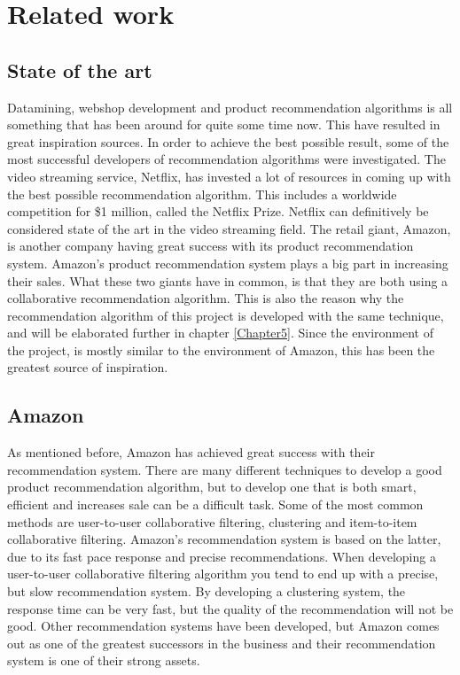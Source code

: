 
\chapter{Related work} %

\label{Chapter3} %


\section{State of the art}

Datamining, webshop development and product recommendation algorithms is all something that has been around for quite some time now. This have resulted in great inspiration sources. In order to achieve the best possible result, some of the most successful developers of recommendation algorithms were investigated. The video streaming service, Netflix, has invested a lot of resources in coming up with the best possible recommendation algorithm.\cite{Netflix} This includes a worldwide competition for \$1 million, called the Netflix Prize. \cite{NetflixPrize} Netflix can definitively be considered state of the art in the video streaming field. The retail giant, Amazon, is another company having great success with its product recommendation system. Amazon's product recommendation system plays a big part in increasing their sales.\cite{AmazonSuccess} What these two giants have in common, is that they are both using a collaborative recommendation algorithm. This is also the reason why the recommendation algorithm of this project is developed with the same technique, and will be elaborated further in chapter \ref{Chapter5}. Since the environment of the project, is mostly similar to the environment of Amazon, this has been the greatest source of inspiration. 


\section{Amazon}
As mentioned before, Amazon has achieved great success with their recommendation system. There are many different techniques to develop a good product recommendation algorithm, but to develop one that is both smart, efficient and increases sale can be a difficult task. Some of the most common methods are user-to-user collaborative filtering, clustering and item-to-item collaborative filtering. Amazon's recommendation system is based on the latter, due to its fast pace response and precise recommendations. When developing a user-to-user collaborative filtering algorithm you tend to end up with a precise, but slow recommendation system. By developing a clustering system, the response time can be very fast, but the quality of the recommendation will not be good. \cite{AmazonRecommendations} Other recommendation systems have been developed, but Amazon comes out as one of the greatest successors in the business and their recommendation system is one of their strong assets.
